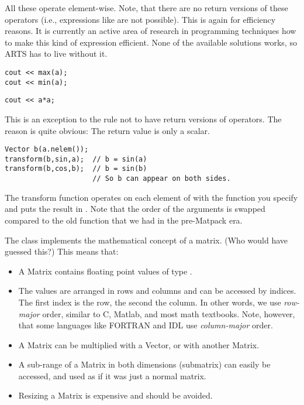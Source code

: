All these operate element-wise.  Note, that there are no return
versions of these operators (i.e., expressions like  are
not possible). This is again for efficiency reasons. It is currently
an active area of research in programming techniques how to make this
kind of expression efficient. None of the available solutions works,
so ARTS has to live without it.

\begin{verbatim}
cout << max(a);
cout << min(a);
\end{verbatim}

\begin{verbatim}
cout << a*a;
\end{verbatim}

This is an exception to the rule not to have return versions of
operators. The reason is quite obvious: The return value is only a
scalar. 

\begin{verbatim}
Vector b(a.nelem());
transform(b,sin,a);  // b = sin(a)
transform(b,cos,b);  // b = sin(b)
                     // So b can appear on both sides.
\end{verbatim}

The transform function operates on each element of  with the
function you specify and puts the result in . Note that the
order of the arguments is swapped compared to the old function
 that we had in the pre-Matpack era.


\label{sec:matpack:matrices}

The class  implements the mathematical concept of a
matrix. (Who would have guessed this?) This means that:
\begin{itemize}
\item A Matrix contains floating point values of type .
\item The values are arranged in rows and columns and can be accessed
  by indices. The first index is the row, the second the column. In
  other words, we use \emph{row-major} order, similar to C, Matlab,
  and most math textbooks. Note, however, that some languages like
  FORTRAN and IDL use \emph{column-major} order.
\item A Matrix can be multiplied with a Vector, or with another
  Matrix.
\item A sub-range of a Matrix in both dimensions (submatrix) can
  easily be accessed, and used as if it was just a normal matrix.
\item Resizing a Matrix is expensive and should be avoided.
\end{itemize}


